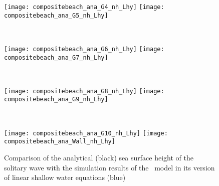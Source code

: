 \begin{figure}[htbp]
\begin{minipage}{\textwidth}
\texttt{[image: compositebeach\_ana\_G4\_nh\_Lhy]}
\texttt{[image: compositebeach\_ana\_G5\_nh\_Lhy]}
\end{minipage} \\
\begin{minipage}{\textwidth}
\texttt{[image: compositebeach\_ana\_G6\_nh\_Lhy]}
\texttt{[image: compositebeach\_ana\_G7\_nh\_Lhy]}
\end{minipage} \\
\begin{minipage}{\textwidth}
\texttt{[image: compositebeach\_ana\_G8\_nh\_Lhy]}
\texttt{[image: compositebeach\_ana\_G9\_nh\_Lhy]}
\end{minipage} \\
\begin{minipage}{\textwidth}
\texttt{[image: compositebeach\_ana\_G10\_nh\_Lhy]}
\texttt{[image: compositebeach\_ana\_Wall\_nh\_Lhy]}
\end{minipage}
\caption{Comparison of the analytical (black) sea surface height of the
solitary wave with the simulation results of the \nh\ model in its version of linear shallow water equations (blue)}
\label{fig:nh_compositebeach_ana_nh_Lhy}
\end{figure}


